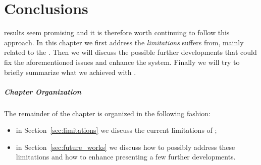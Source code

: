 

\chapter{Conclusions} %
\label{chap:conclusions}
 results seem promising and it is therefore worth continuing to
follow this approach. In this chapter we first address the \emph{limitations}
\thesystem suffers from, mainly related to the . Then
we will discuss the possible further developments that could fix the aforementioned
issues and enhance the system. Finally we will try to briefly summarize what we
achieved with \thesystem.

\paragraph{Chapter Organization} The remainder of the chapter is organized in
the following fashion:
\begin{itemize}
    \item in Section~\ref{sec:limitations} we discuss the current limitations of
        \thesystem;
    \item in Section~\ref{sec:future_works} we discuss how to possibly address these
        limitations and how to enhance \thesystem presenting a few further developments.
\end{itemize}

\newpage

